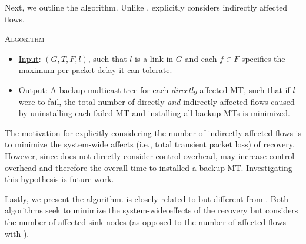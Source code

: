
Next, we outline the \mf algorithm.  Unlike \mcs, \mf explicitly considers indirectly affected flows. 

\mf \textsc{Algorithm}
\vspace{-0.3cm}
\begin{itemize}

	\item  \underline{Input}: $(G,T,F,l)$, such that $l$ is a link in $G$ and each $f \in F$ specifies the maximum per-packet delay it can tolerate.

	\item \underline{Output}:  A backup multicast tree for each \emph{directly} affected MT, such that if $l$ were to fail, the total number of directly \emph{and} indirectly affected flows caused by 
	uninstalling each failed MT and installing all backup MTs is minimized.

\end{itemize}
\vspace{-0.3cm}
The motivation for explicitly considering the number of indirectly affected flows is to minimize the system-wide affects (i.e., total transient packet loss) of recovery.
However, since \mf does not directly consider control overhead, \mf 
may increase control overhead and therefore the overall time to installed a backup MT. Investigating this hypothesis is future work.



Lastly, we present the \md algorithm. \md is closely related to but different from \mfs.  Both algorithms seek to minimize the system-wide effects of the recovery but \md considers the number of affected sink nodes (as opposed to the number 
of affected flows with \mfs).  

